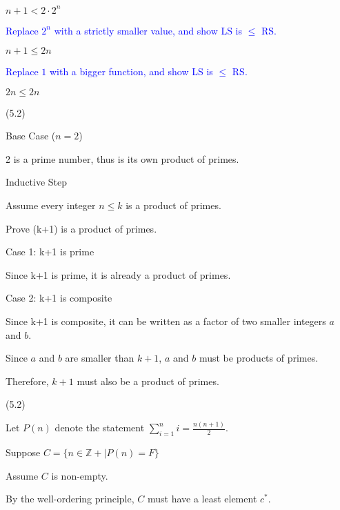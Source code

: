 \documentclass{exam}
\begin{document}
\begin{questions}
\begin{center}
\( n+1 < 2 \cdot 2^n \) 

\textcolor{blue}{Replace \(2^n\) with a strictly smaller value, and show LS is \(\leq\) RS.}

\( n+1 \leq 2n \) 

\textcolor{blue}{Replace \(1\) with a bigger function, and show LS is \(\leq\) RS.}

\( 2n \leq 2n \)

\end{center}

 (5.2)

\begin{center}
Base Case (\(n = 2\))

2 is a prime number, thus is its own product of primes.

\vspace{5px}

Inductive Step

Assume every integer \( n \leq k \) is a product of primes. 

Prove (k+1) is a product of primes.

Case 1: k+1 is prime

Since k+1 is prime, it is already a product of primes.
\vspace{5px}

Case 2: k+1 is composite

Since k+1 is composite, it can be written as a factor of two smaller integers \(a\) and \(b\).

Since \(a\) and \(b\) are smaller than \(k+1\), \(a\) and \(b\) must be products of primes.

Therefore, \(k+1\) must also be a product of primes.

\end{center}

\newpage

 (5.2)

\begin{center}

Let \(P(n)\) denote the statement \( \sum_{i=1}^{n} i = \frac{n(n+1)}{2} \).

Suppose \(C = \{n \in \mathbb{Z+} | P(n) = F\}\)

Assume \(C\) is non-empty.

By the well-ordering principle, \(C\) must have a least element \(c^*\).


\end{center}
\end{questions}
\end{document}
